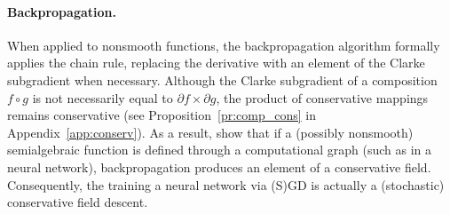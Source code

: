 \begin{comment}
  For semialgebraicfunction, $\partial \cL$ is the minimal convex-valued conservative field. 
\begin{proposition}[\cite{drusvyatskiy2015curves, dav-dru-kak-lee-19,bolte2021conservative}]
  Let $\cL$ be semialgebraic potential of $D: \bbR^{d} \rightrightarrows \bbR^d$. Then, $\partial \cL$ is a semialgebraic conservative field for $\cL$ and for all $w \in \bbR^d$, 
  \begin{equation*}
    \partial \cL(w) \subset \conv D(w)\, .
  \end{equation*}
\end{proposition}
\end{comment}

\paragraph{Backpropagation.} When applied to nonsmooth functions, the backpropagation algorithm formally applies the chain rule, replacing the derivative with an element of the Clarke subgradient when necessary. Although the Clarke subgradient of a composition $f \circ g$ is not necessarily equal to $\partial f \times \partial g$, the product of conservative mappings remains conservative (see Proposition~\ref{pr:comp_cons} in Appendix~\ref{app:conserv}).
As a result, \cite[Section 5]{bolte2021conservative} show that if a (possibly nonsmooth) semialgebraic function is defined through a computational graph (such as in a neural network), backpropagation produces an element of a conservative field. Consequently, the training a neural network via (S)GD is actually a (stochastic) conservative field descent.